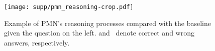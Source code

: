 \documentclass{article}
\newcommand{\cmark}{{\color{ForestGreen}\ding{51}}}
\newcommand{\xmark}{{\color{BrickRed}\ding{55}}}
\begin{document}
\begin{figure}[!htb]
\vspace{-2mm}
\texttt{[image: supp/pmn\_reasoning-crop.pdf]}
\caption{\small Example of PMN's reasoning processes compared with the baseline given the question on the left. \cmark and \xmark~denote correct and wrong answers, respectively.}
\label{fig:appendixc}
\vspace{-2mm}
\end{figure}
\end{document}
